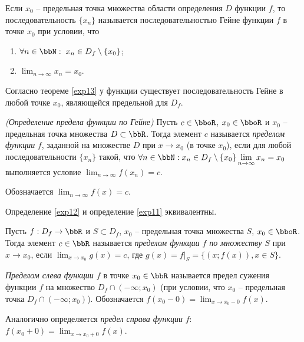 \begin{defn}
Если $x_0$ -- предельная точка множества области определения $D$ функции $f$, то последовательность $\{x_n\}$ называется последовательностью Гейне функции $f$ в точке $x_0$ при условии, что
\begin{enumerate}
\item $\forall n \in \bbN:\; x_n\in D_f\setminus \{x_0\}$;
\item $\lim_{n \to \infty}\limits x_n = x_0$.
\end{enumerate}
Согласно теореме \ref{exp13} у функции существует последовательность Гейне в любой точке $x_0$, являющейся предельной для $D_f$.
\end{defn}

\begin{defn}
\label{exp11} \textit{(Определение предела функции по Гейне)}
Пусть $c\in\bboR$, $x_0 \in \bboR$ и $x_0$ -- предельная точка множества $D \subset \bbR$. Тогда элемент $c$ называется \textit{пределом функции} $f$, заданной на множестве $D$ при $x \to x_0$ (в точке $x_0$), если для любой последовательности $\{x_n\}$ такой, что $\forall n \in \bbN: x_n\in D_f\setminus \{x_0\} \lim_{n \to \infty}\limits x_n = x_0$ выполняется условие $\lim_{n \to \infty}\limits f(x_n) = c$. 
\end{defn}

Обозначается $\lim_{n \to \infty}\limits f(x) = c$.

\begin{thm}
Определение \ref{exp12} и определение \ref{exp11} эквивалентны.
\end{thm}

\begin{defn}
Пусть $f: D_f \to \bbR$ и $S \subset D_f$, $x_0$ -- предельная точка множества $S$, $x_0 \in \bboR$. Тогда элемент $c \in \bbR$ называется \textit{пределом функции $f$ по множеству $S$} при $x \to x_0$, если $\lim_{x \to x_0}\limits g(x) = c$, где $g(x)=\left.f\right|_S = \{(x;f(x)),x \in S\}$.
\end{defn}

\begin{defn}
\textit{Пределом слева функции $f$} в точке $x_0 \in \bbR$ называется предел сужения функции $f$ на множество $D_f \cap (-\infty;x_0)$ (при условии, что  $x_0$ -- предельная точка $D_f \cap (-\infty;x_0)$). Обозначается $f(x_0-0)=\lim_{x \to x_0-0}\limits f(x)$.

Аналогично определяется \textit{предел справа функции} $f$: $f(x_0+0)=\lim_{x \to x_0+0}\limits f(x)$. 
\end{defn}



